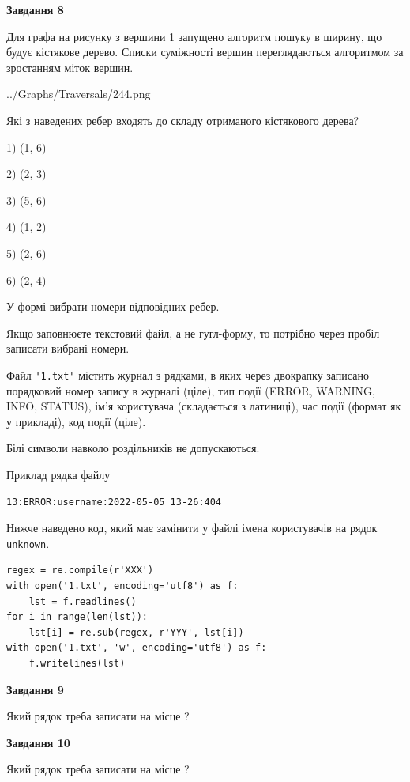 \documentclass[12pt, ukrainian]{article}
\def\code#1{\Verb!#1!}
\begin{document}
{\begin {large}
{\begin {center}\textbf{Завдання 8}\end {center}}\par
Для графа на рисунку з вершини 1 запущено алгоритм пошуку в ширину, що будує кістякове дерево. Списки суміжності вершин переглядаються алгоритмом за зростанням міток вершин.\par
\begin{center}
	{../Graphs/Traversals/244.png}
\end{center}
\par Які з наведених ребер входять до складу отриманого кістякового дерева?\par
1) (1, 6)\par
2) (2, 3)\par
3) (5, 6)\par
4) (1, 2)\par
5) (2, 6)\par
6) (2, 4)\par
{\vskip 15pt} У формі вибрати номери відповідних ребер.


Якщо заповнюєте текстовий файл, а не гугл-форму, то потрібно через пробіл записа\-ти вибрані номери.\par
\newpage


Файл \code{'1.txt'} містить журнал з рядками, в яких через двокрапку записано поряд\-ко\-вий номер запису в журналі (ціле), тип події (ERROR, WARNING, INFO, STATUS), ім'я користувача (складається з латиниці), час події (фор\-мат як у прикладі), код події (ціле).

Білі символи навколо роздільників не допускаються.

Приклад рядка файлу



\begin{verbatim}
13:ERROR:username:2022-05-05 13-26:404
\end{verbatim}


Нижче наведено код, який має замінити у файлі імена користувачів на рядок \code{unknown}.



\begin{verbatim}
regex = re.compile(r'XXX')
with open('1.txt', encoding='utf8') as f:
    lst = f.readlines()
for i in range(len(lst)):
    lst[i] = re.sub(regex, r'YYY', lst[i])
with open('1.txt', 'w', encoding='utf8') as f:
    f.writelines(lst)
\end{verbatim}




{\begin {center}\textbf{Завдання 9}\end {center}}\par
Який рядок треба записати на місце  ?\par
\vspace{5mm}


{\begin {center}\textbf{Завдання 10}\end {center}}\par
Який рядок треба записати на місце  ?\par


\newpage


\end {large}}
\end{document}
